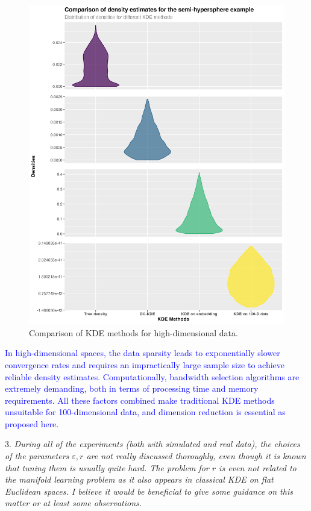\documentclass{article}
\begin{document}
   \begin{figure}[!h]
   	\begin{center}
    \includegraphics[width=0.4\linewidth]{kde_compare_violin.jpeg}\end{center}
    \caption{Comparison of KDE methods for high-dimensional data.}
    \label{fig:kde}
    \end{figure}

   \textcolor{blue}{
   In high-dimensional spaces, the data sparsity leads to exponentially slower convergence rates and requires an impractically large sample size to achieve reliable density estimates. Computationally, bandwidth selection algorithms are extremely demanding, both in terms of processing time and memory requirements. All these factors combined make traditional KDE methods unsuitable for 100-dimensional data, and dimension reduction is essential as proposed here.
   }

3. \textit{During all of the experiments (both with simulated and real data), the choices of the parameters \(\varepsilon, r\) are not really discussed thoroughly, even though it is known that tuning them is usually quite hard. The problem for \(r\) is even not related to the manifold learning problem as it also appears in classical KDE on flat Euclidean spaces. I believe it would be beneficial to give some guidance on this matter or at least some observations.}
\end{document}
